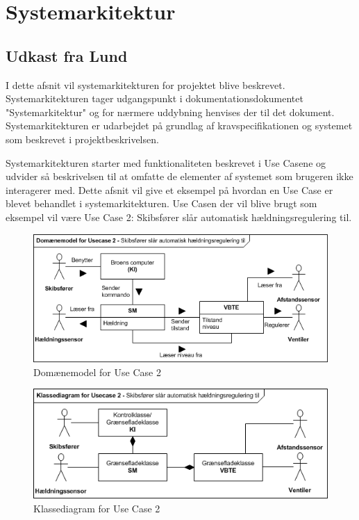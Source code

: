 \section{Systemarkitektur}
\subsection{Udkast fra Lund}
I dette afsnit vil systemarkitekturen for projektet blive beskrevet. Systemarkitekturen tager udgangspunkt i dokumentationsdokumentet "Systemarkitektur" og for nærmere uddybning henvises der til det dokument. 
Systemarkitekturen er udarbejdet på grundlag af kravspecifikationen og systemet som beskrevet i projektbeskrivelsen.

Systemarkitekturen starter med funktionaliteten beskrevet i Use Casene og udvider så beskrivelsen til at omfatte de elementer af systemet som brugeren ikke interagerer med. Dette afsnit vil give et eksempel på hvordan en Use Case er blevet behandlet i systemarkitekturen. Use Casen der vil blive brugt som eksempel vil være Use Case 2: Skibsfører slår automatisk hældningsregulering til.

\begin{figure}[htbp]
\centering
\includegraphics[scale=0.8]{billeder/Systemarkitektur/DM_UC2}
\caption{Domænemodel for Use Case 2}
\label{fig:dmuc2}
\end{figure}

\begin{figure}[htbp]
\centering
\includegraphics[scale=0.8]{billeder/Systemarkitektur/KD_UC2}
\caption{Klassediagram for Use Case 2}
\label{fig:kduc2}
\end{figure}

